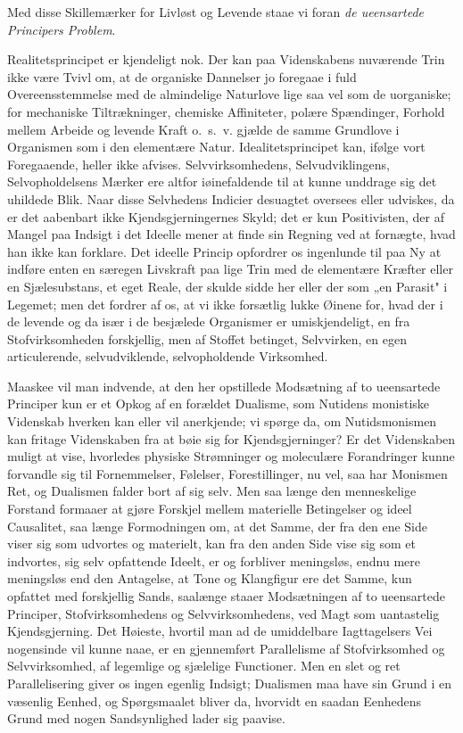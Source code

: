 \documentclass[12pt]{article}
\newcommand{\opage}[1]{\marginnote{\footnotesize\textit{[#1]}}}
\begin{document}
Med disse Skillemærker for Livløst og Levende staae vi foran
\emph{de ueensartede Principers Problem}.

Realitetsprincipet er kjendeligt nok. Der kan paa Videnskabens
nuværende Trin ikke være Tvivl om, at de organiske Dannelser jo
foregaae i fuld Overeensstemmelse med de almindelige Naturlove lige
saa vel som de uorganiske; for mechaniske Tiltrækninger, chemiske
Affiniteter, polære Spændinger, Forhold mellem Arbeide og levende
Kraft o.\ s.\ v. gjælde de samme Grundlove i Organismen som i den
elementære Natur. Idealitetsprincipet kan, ifølge vort Foregaaende,
heller ikke afvises. Selvvirksomhedens, Selvudviklingens,
Selvopholdelsens Mærker ere altfor iøinefaldende til at kunne
unddrage sig det uhildede Blik. Naar disse Selvhedens Indicier
desuagtet oversees eller udviskes, da er det aabenbart ikke
Kjendsgjerningernes Skyld; det er kun Positivisten, der af Mangel
paa Indsigt i det Ideelle
\opage{55} mener at finde sin Regning ved at fornægte, hvad han ikke kan
forklare. Det ideelle Princip opfordrer os ingenlunde til paa Ny at
indføre enten en særegen Livskraft paa lige Trin med de elementære
Kræfter eller en Sjælesubstans, et eget Reale, der skulde sidde her
eller der som „en Parasit" i Legemet; men det fordrer af os, at vi
ikke forsætlig lukke Øinene for, hvad der i de levende og da især i
de besjælede Organismer er umiskjendeligt, en fra Stofvirksomheden
forskjellig, men af Stoffet betinget, Selvvirken, en egen
articulerende, selvudviklende, selvopholdende Virksomhed.

Maaskee vil man indvende, at den her opstillede Modsætning af to
ueensartede Principer kun er et Opkog af en forældet Dualisme, som
Nutidens monistiske Videnskab hverken kan eller vil anerkjende; vi
spørge da, om Nutidsmonismen kan fritage Videnskaben fra at bøie sig
for Kjendsgjerninger? Er det Videnskaben muligt at vise, hvorledes
physiske Strømninger og moleculære Forandringer kunne forvandle sig
til Fornemmelser, Følelser, Forestillinger, nu vel, saa har
Monismen Ret, og Dualismen falder bort af sig selv. Men saa længe
den menneskelige Forstand formaaer at gjøre Forskjel mellem
materielle Betingelser og ideel Causalitet, saa længe Formodningen
om, at det Samme, der fra den ene Side viser sig som udvortes og
materielt, kan fra den anden Side vise sig som et indvortes, sig
selv opfattende Ideelt, er og forbliver meningsløs, endnu mere
meningsløs end den Antagelse, at Tone og Klangfigur ere det Samme,
kun opfattet med forskjellig Sands, saalænge staaer Modsætningen af
to ueensartede Principer, Stofvirksomhedens og Selvvirksomhedens,
ved Magt som uantastelig Kjendsgjerning. Det Høieste, hvortil man ad
de umiddelbare Iagttagelsers Vei nogensinde vil kunne naae, er en
gjennemført Parallelisme af Stofvirksomhed og Selvvirksomhed, af
legemlige og sjælelige Functioner. Men en slet og ret Parallelisering
giver os ingen egenlig Indsigt; Dualismen maa have sin Grund i en
væsenlig Eenhed, og Spørgsmaalet bliver da, hvorvidt en saadan
Eenhedens Grund med nogen Sandsynlighed lader sig paavise.
\end{document}

